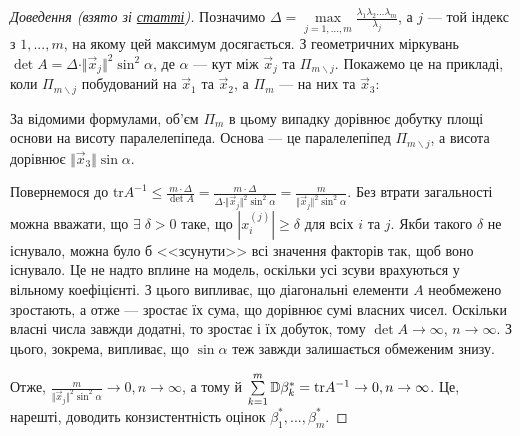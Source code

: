 \begin{proof}[Доведення (взято зі \href{http://esgi-miet.ru/images/Stati20161/18-20GafarovaZavialovaMustafin.pdf}{статті})]
    Позначимо 
    $\Delta = \underset{j=1,...,m}{\max}\frac{\lambda_1 \lambda_2 ... \lambda_m}{\lambda_j}$, а $j$ --- той індекс з $1,...,m$,
    на якому цей максимум досягається. З геометричних міркувань
    $\det A = \Delta \cdot \Vert \vec{x}_j \Vert^2 \sin^2 \alpha$, де $\alpha$ --- кут
    між $\vec{x}_j$ та $\Pi_{m \backslash j}$. Покажемо це на прикладі, коли $\Pi_{m \backslash j}$ побудований
    на $\vec{x}_1$ та $\vec{x}_2$, а $\Pi_m$ --- на них та $\vec{x}_3$:
    \begin{center}
    \end{center}
    За відомими формулами, об'єм $\Pi_m$ в цьому випадку дорівнює добутку площі основи на висоту паралелепіпеда.
    Основа --- це паралелепіпед $\Pi_{m \backslash j}$, а висота дорівнює $\Vert \vec{x}_3 \Vert \sin \alpha$.

    Повернемося до $\mathrm{tr} A^{-1} \leq \frac{m\cdot\Delta}{\det A} = 
    \frac{m\cdot\Delta}{\Delta \cdot \Vert \vec{x}_j \Vert^2 \sin^2 \alpha} = 
    \frac{m}{\Vert \vec{x}_j \Vert^2 \sin^2 \alpha}$.
    Без втрати загальності можна вважати, що $\exists \; \delta > 0$ таке, що 
    $\left|x_i^{(j)}\right| \geq \delta$ для всіх $i$ та $j$. Якби такого $\delta$
    не існувало, можна було б <<зсунути>> всі значення факторів так, щоб воно існувало.
    Це не надто вплине на модель, оскільки усі зсуви врахуються у вільному коефіцієнті.
    З цього випливає, що діагональні елементи $A$ необмежено зростають, а отже --- зростає їх сума, що дорівнює сумі власних чисел.
    Оскільки власні числа завжди додатні, то зростає і їх добуток, тому $\det A \to \infty$, $n\to\infty$.
    З цього, зокрема, випливає, що $\sin\alpha$ теж завжди залишається обмеженим знизу.
   
    Отже, $\frac{m}{\Vert \vec{x}_j \Vert^2 \sin^2 \alpha} \to 0, n\to\infty$, а тому й
    $\sum\limits_{k=1}^m \mathbb{D}\beta_k^* = \mathrm{tr}A^{-1} \to 0, n\to\infty$. Це, нарешті, доводить конзистентність оцінок $\beta_1^*, ..., \beta_m^*$.
\end{proof}

